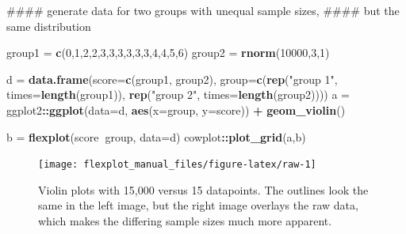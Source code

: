 \documentclass[,]{book}
\newenvironment{Shaded}{\begin{snugshade}}{\end{snugshade}}
\newcommand{\KeywordTok}[1]{\textcolor[rgb]{0.13,0.29,0.53}{\textbf{#1}}}
\newcommand{\DataTypeTok}[1]{\textcolor[rgb]{0.13,0.29,0.53}{#1}}
\newcommand{\DecValTok}[1]{\textcolor[rgb]{0.00,0.00,0.81}{#1}}
\newcommand{\StringTok}[1]{\textcolor[rgb]{0.31,0.60,0.02}{#1}}
\newcommand{\OperatorTok}[1]{\textcolor[rgb]{0.81,0.36,0.00}{\textbf{#1}}}
\newcommand{\NormalTok}[1]{#1}
\begin{document}
\begin{Shaded}
\begin{Highlighting}[]
\NormalTok{#### generate data for two groups with unequal sample sizes, }
\NormalTok{#### but the same distribution}

\NormalTok{group1 =}\StringTok{ }\KeywordTok{c}\NormalTok{(}\DecValTok{0}\NormalTok{,}\DecValTok{1}\NormalTok{,}\DecValTok{2}\NormalTok{,}\DecValTok{2}\NormalTok{,}\DecValTok{3}\NormalTok{,}\DecValTok{3}\NormalTok{,}\DecValTok{3}\NormalTok{,}\DecValTok{3}\NormalTok{,}\DecValTok{3}\NormalTok{,}\DecValTok{3}\NormalTok{,}\DecValTok{4}\NormalTok{,}\DecValTok{4}\NormalTok{,}\DecValTok{5}\NormalTok{,}\DecValTok{6}\NormalTok{)}
\NormalTok{group2 =}\StringTok{ }\KeywordTok{rnorm}\NormalTok{(}\DecValTok{10000}\NormalTok{,}\DecValTok{3}\NormalTok{,}\DecValTok{1}\NormalTok{)}

\NormalTok{d =}\StringTok{ }\KeywordTok{data.frame}\NormalTok{(}\DataTypeTok{score=}\KeywordTok{c}\NormalTok{(group1, group2), }
               \DataTypeTok{group=}\KeywordTok{c}\NormalTok{(}\KeywordTok{rep}\NormalTok{(}\StringTok{"group 1"}\NormalTok{, }\DataTypeTok{times=}\KeywordTok{length}\NormalTok{(group1)), }
                       \KeywordTok{rep}\NormalTok{(}\StringTok{"group 2"}\NormalTok{, }\DataTypeTok{times=}\KeywordTok{length}\NormalTok{(group2))))}
\NormalTok{a =}\StringTok{ }\NormalTok{ggplot2}\OperatorTok{::}\KeywordTok{ggplot}\NormalTok{(}\DataTypeTok{data=}\NormalTok{d, }\KeywordTok{aes}\NormalTok{(}\DataTypeTok{x=}\NormalTok{group, }\DataTypeTok{y=}\NormalTok{score)) }\OperatorTok{+}\StringTok{  }\KeywordTok{geom_violin}\NormalTok{() }

\NormalTok{b =}\StringTok{ }\KeywordTok{flexplot}\NormalTok{(score}\OperatorTok{~}\NormalTok{group, }\DataTypeTok{data=}\NormalTok{d)}
\NormalTok{cowplot}\OperatorTok{::}\KeywordTok{plot_grid}\NormalTok{(a,b)}
\end{Highlighting}
\end{Shaded}

\begin{figure}

{\centering \texttt{[image: flexplot\_manual\_files/figure-latex/raw-1]} 

}

\caption{Violin plots with 15,000 versus 15 datapoints. The outlines look the same in the left image, but the right image overlays the raw data, which makes the differing sample sizes much more apparent.}\label{fig:raw}
\end{figure}
\end{document}
